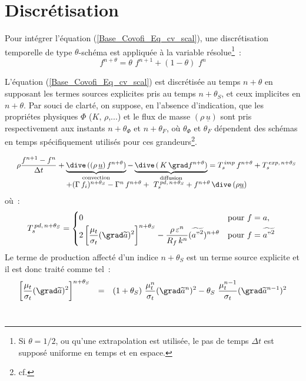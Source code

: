 \section*{Discrétisation}
Pour intégrer l'équation (\ref{Base_Covofi_Eq_cv_scal}), une discrétisation temporelle de
type $\theta$-schéma est appliquée à la variable résolue\footnote{Si
$\theta=1/2$, ou qu'une extrapolation est utilisée, le pas de temps $\Delta t$
est supposé uniforme en temps et en espace.}~:
\begin{equation}
f^{n+\theta} = \theta \,\, f^{n+1} + (1-\theta)\,\, f^{n}
\end{equation}

L'équation (\ref{Base_Covofi_Eq_cv_scal}) est discrétisée au temps $n+\theta$ en
supposant les termes sources explicites pris au temps $n+\theta_{S}$, et ceux
implicites en $n+\theta$.
Par souci de clarté, on suppose, en l'absence d'indication, que les propriétes
physiques $\Phi$ ($K,\,\rho$,...) et le flux de masse $(\rho\,\underline{u})$
sont pris respectivement aux instants $n+\theta_\Phi$ et $n+\theta_F$, où
$\theta_\Phi$ et $\theta_F$ dépendent des schémas en temps spécifiquement
utilisés pour ces grandeurs\footnote{cf. }.

\begin{equation}
\begin{array}{lcl}
&\displaystyle
 \rho \frac {f^{n+1}-f^{n}}{\Delta t} +
\underbrace{\dive\,((\rho\,\underline{u})\,f^{n+\theta})}_{\text{convection}}
- \underbrace{\dive\,(\,K\,\grad f^{n+\theta})}_{\text{diffusion}} =
T_s^{\,imp}\,f^{n+\theta} + T_s^{\,exp,\,n+\theta_{S}}\\
& + (\Gamma\,f_i)^{n+\theta_{S}}-\Gamma^{n}\,f^{n+\theta} +\
T_s^{\,pd,\,n+\theta_S} + f^{n+\theta}\,\dive\,(\rho\underline{u})
\end{array}
\end{equation}
où~:
\begin{equation}
 T_s^{\,pd,\,n+\theta_S} =
\begin{cases}
0 & \text{pour $f=a$}, \\
2 \displaystyle \left[\frac{\mu_t}{\sigma_t}(\grad \widetilde{a})^2\right]^{n+\theta_S}-\frac{\rho\,
\varepsilon^{n}}{R_f\,k^{n}}(\widetilde{{a"}^2})^{n+\theta}& \text{pour $f=\widetilde{{a"}^2}$ }
\end{cases}
\end{equation}
Le terme de production affecté d'un indice $n+\theta_{S}$ est un terme source
explicite et il est donc traité comme tel~:
\begin{equation}
\begin{array}{rll}
\displaystyle
\left[\frac{\mu_t}{\sigma_t}(\grad
\widetilde{a})^2\right]^{n+\theta_{S}}&=&\displaystyle
(1+\theta_{S})\,\,\frac{\mu_t^{n}}{\sigma_t}(\grad
\widetilde{a}^{n})^2-\theta_{S}\,\,\frac{\mu_t^{n-1}}{\sigma_t}(\grad
\widetilde{a}^{n-1})^2\\
\end{array}
\end{equation}
\\

